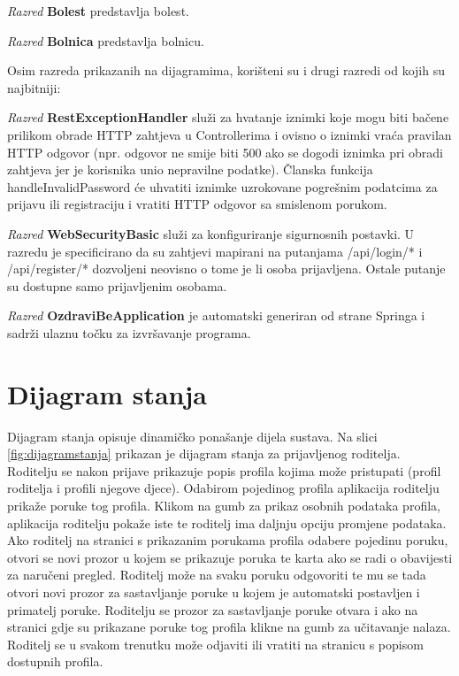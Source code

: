 			\textit{Razred }\textbf{Bolest} predstavlja bolest.
			
			\textit{Razred }\textbf{Bolnica} predstavlja bolnicu.
			
			
			Osim razreda prikazanih na dijagramima, korišteni su i drugi razredi od kojih su najbitniji:
			
			\textit{Razred }\textbf{RestExceptionHandler}
			služi za hvatanje iznimki koje mogu biti bačene prilikom obrade HTTP zahtjeva u Controllerima i ovisno o iznimki
			vraća pravilan HTTP odgovor (npr. odgovor ne smije biti 500 ako se dogodi iznimka pri obradi zahtjeva jer je korisnika
			unio nepravilne podatke). Članska funkcija handleInvalidPassword će uhvatiti iznimke uzrokovane
			pogrešnim podatcima za prijavu ili registraciju i vratiti HTTP odgovor sa smislenom porukom.
			
			\textit{Razred }\textbf{WebSecurityBasic}
			služi za konfiguriranje sigurnosnih postavki. U razredu je specificirano da su zahtjevi mapirani na putanjama /api/login/* i /api/register/* dozvoljeni neovisno o tome je li osoba prijavljena. Ostale putanje su dostupne samo prijavljenim osobama.
			
			\textit{Razred }\textbf{OzdraviBeApplication}
			je automatski generiran od strane Springa i sadrži ulaznu točku za izvršavanje programa.
			
			\eject
		
		\section{Dijagram stanja}
			
			
			Dijagram stanja opisuje dinamičko ponašanje dijela sustava. Na slici \ref{fig:dijagramstanja} prikazan je dijagram stanja za prijavljenog roditelja. Roditelju se nakon prijave prikazuje popis profila kojima može pristupati (profil roditelja i profili njegove djece). Odabirom pojedinog profila aplikacija roditelju prikaže poruke tog profila. Klikom na gumb za prikaz osobnih podataka profila, aplikacija roditelju pokaže iste te roditelj ima daljnju opciju promjene podataka. Ako roditelj na stranici s prikazanim porukama profila odabere pojedinu poruku, otvori se novi prozor u kojem se prikazuje poruka te karta ako se radi o obavijesti za naručeni pregled. Roditelj može na svaku poruku odgovoriti te mu se tada otvori novi prozor za sastavljanje poruke u kojem je automatski postavljen i primatelj poruke. Roditelju se prozor za sastavljanje poruke otvara i ako na stranici gdje su prikazane poruke tog profila klikne na gumb za učitavanje nalaza. Roditelj se u svakom trenutku može odjaviti ili vratiti na stranicu s popisom dostupnih profila.
			
